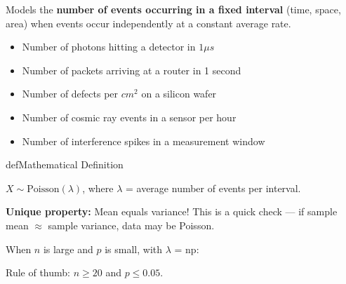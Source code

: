 

Models the \textbf{number of events occurring in a fixed interval} (time, space, area) when events occur independently at a constant average rate.


\begin{itemize}
\tightlist
\item
  Number of photons hitting a detector in $1 \mu s$
\item
  Number of packets arriving at a router in 1 second
\item
  Number of defects per $cm^{2}$ on a silicon wafer
\item
  Number of cosmic ray events in a sensor per hour
\item
  Number of interference spikes in a measurement window
\end{itemize}

\begin{PSbox}[unbreakable]{def}{Mathematical Definition}

$X \sim \mathrm{Poisson}(\lambda)$, where $\lambda$ = average number of events per interval.

\end{PSbox}









\textbf{Unique property:} Mean equals variance! This is a quick check — if sample mean \ensuremath{\approx} sample variance, data may be Poisson.


When $n$ is large and $p$ is small, with $\lambda$ = np:


Rule of thumb: $n \ge 20$ and $p \le 0.05$.

